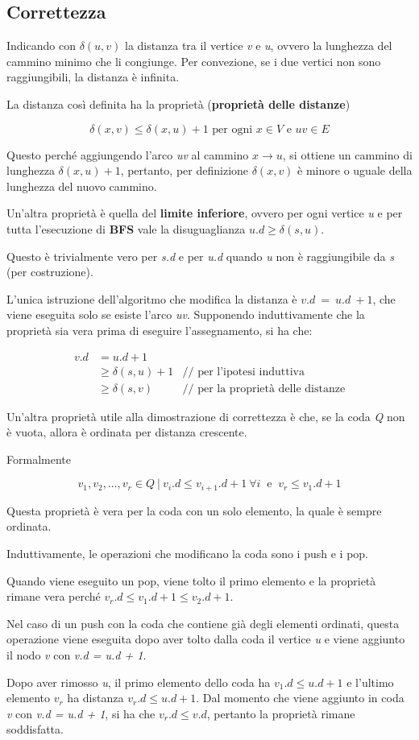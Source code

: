 \subsection{Correttezza}\label{correttezza}

Indicando con $\delta(u,v)$ la distanza tra il vertice \emph{v} e
\emph{u}, ovvero la lunghezza del cammino minimo che li congiunge. Per
convezione, se i due vertici non sono raggiungibili, la distanza è
infinita.

La distanza così definita ha la proprietà (\textbf{proprietà delle distanze}) 

$$\delta(x,v) \leq \delta(x,u) + 1 \text{ per ogni } x \in V \text{ e } uv \in E$$
 
Questo perché aggiungendo l'arco \emph{uv} al cammino $ x \rightarrow u$, si ottiene un cammino di
lunghezza $\delta(x,u) + 1$, pertanto, per definizione $\delta(x,v)$ è
minore o uguale della lunghezza del nuovo cammino.

Un'altra proprietà è quella del \textbf{limite inferiore}, ovvero per
ogni vertice \emph{u} e per tutta l'esecuzione di \textbf{BFS} vale la
disuguaglianza $u.d \geq \delta(s,u)$.

Questo è trivialmente vero per \emph{s.d} e per \emph{u.d} quando \emph{u} non è raggiungibile da \emph{s} (per costruzione).

L'unica istruzione dell'algoritmo che modifica la distanza è
$v.d\ =\ u.d\ + 1$, che viene eseguita solo se esiste l'arco
\emph{uv}. Supponendo induttivamente che la proprietà sia vera prima di
eseguire l'assegnamento, si ha che:

\begin{align*}
v.d &= u.d + 1 &\\
     &\geq \delta(s,u) + 1 & \text{// per l'ipotesi induttiva }\\
     &\geq \delta(s,v)   & \text{// per la proprietà delle distanze}
\end{align*}

Un'altra proprietà utile alla dimostrazione di correttezza è che, se la
coda \emph{Q} non è vuota, allora è ordinata per distanza crescente.

Formalmente

$$
v_1, v_2, \ldots, v_r \in Q \: | \:  v_i.d \leq v_{i+1}.d + 1 \: \forall i \: \text{ e } \: v_r \leq v_1.d +1
$$

Questa proprietà è vera per la coda con un solo elemento, la quale è
sempre ordinata.

Induttivamente, le operazioni che modificano la coda sono i push e i
pop.

Quando viene eseguito un pop, viene tolto il primo elemento e la
proprietà rimane vera perché $v_r.d \leq v_1.d + 1 \leq v_2.d + 1$.

Nel caso di un push con la coda che contiene già degli elementi
ordinati, questa operazione viene eseguita dopo aver tolto dalla coda il
vertice \emph{u} e viene aggiunto il nodo \emph{v} con \emph{v.d = u.d +
1}.

Dopo aver rimosso \emph{u}, il primo elemento dello coda ha  $v_1.d \leq u.d + 1$ e l'ultimo elemento $v_r$ ha distanza
$v_r.d \leq u.d +1$. Dal momento che viene aggiunto in
coda \emph{v} con \emph{v.d = u.d + 1}, si ha che $v_r.d \leq v.d$, pertanto la proprietà rimane soddisfatta.

